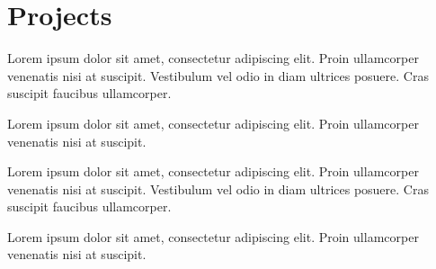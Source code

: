 \documentclass[]{plushcv}
\begin{document}
\begin{minipage}[t]{0.70\textwidth}

\section{Projects}

\begin{tightemize}
\item Lorem ipsum dolor sit amet, consectetur adipiscing elit. Proin ullamcorper venenatis nisi at suscipit. Vestibulum vel odio in diam ultrices posuere. Cras suscipit faucibus ullamcorper.
\item Lorem ipsum dolor sit amet, consectetur adipiscing elit. Proin ullamcorper venenatis nisi at suscipit.
\end{tightemize}
\sectionsep

\begin{tightemize}
\item Lorem ipsum dolor sit amet, consectetur adipiscing elit. Proin ullamcorper venenatis nisi at suscipit. Vestibulum vel odio in diam ultrices posuere. Cras suscipit faucibus ullamcorper.
\item Lorem ipsum dolor sit amet, consectetur adipiscing elit. Proin ullamcorper venenatis nisi at suscipit.
\end{tightemize}
\sectionsep


%
%

\end{minipage}
\hfill
\end{document}
